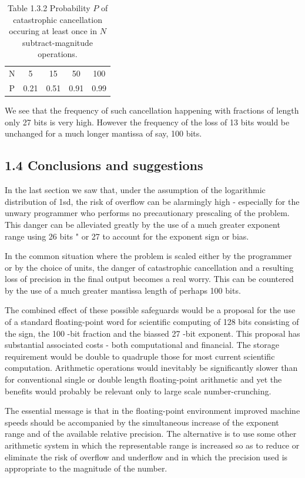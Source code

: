 \documentclass[10pt]{article}
\begin{document}
\begin{table}[h]
\begin{center}
\captionsetup{labelformat=empty}
\caption{Table 1.3.2 Probability $P$ of catastrophic cancellation occuring at least once in $N$ subtract-magnitude operations.}
\begin{tabular}{ccccc}
N & 5 & 15 & 50 & 100 \\
P & 0.21 & 0.51 & 0.91 & 0.99 \\
\end{tabular}
\end{center}
\end{table}

We see that the frequency of such cancellation happening with fractions of length only 27 bits is very high. However the frequency of the loss of 13 bits would be unchanged for a much longer mantissa of say, 100 bits.

\subsection*{1.4 Conclusions and suggestions}
In the last section we saw that, under the assumption of the logarithmic distribution of 1sd, the risk of overflow can be alarmingly high - especially for the unwary programmer who performs no precautionary prescaling of the problem. This danger can be alleviated greatly by the use of a much greater exponent range using 26 bits " or 27 to account for the exponent sign or bias.

In the common situation where the problem is scaled either by the programmer or by the choice of units, the danger of catastrophic cancellation and a resulting loss of precision in the final output becomes a real worry. This can be countered by the use of a much greater mantissa length of perhaps 100 bits.

The combined effect of these possible safeguards would be a proposal for the use of a standard floating-point word for scientific computing of 128 bits consisting of the sign, the 100 -bit fraction and the biassed 27 -bit exponent. This proposal has substantial associated costs - both computational and financial. The storage requirement would be double to quadruple those for most current scientific computation. Arithmetic operations would inevitably be significantly slower than for conventional single or double length floating-point arithmetic and yet the benefits would probably be relevant only to large scale number-crunching.

The essential message is that in the floating-point environment improved machine speeds should be accompanied by the simultaneous increase of the exponent range and of the available relative precision. The alternative is to use some other arithmetic system in which the representable range is increased so as to reduce or eliminate the risk of overflow and underflow and in which the precision used is appropriate to the magnitude of the number.
\end{document}

